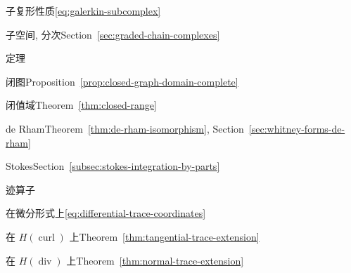 \begin{theindex}
\item {}\label{index:subcomplex-property}{子复形性质}\quad \eqref{eq:galerkin-subcomplex}

\item {}\label{index:subspace-graded}{子空间, 分次}\quad Section~\ref{sec:graded-chain-complexes}

\item {}\label{index:theorem}{定理}

\subitem {}\label{index:theorem-closed-graph}{闭图}\quad Proposition~\ref{prop:closed-graph-domain-complete}

\subitem {}\label{index:theorem-closed-range}{闭值域}\quad Theorem~\ref{thm:closed-range}

\subitem {}\label{index:theorem-de-rham}{de Rham}\quad Theorem~\ref{thm:de-rham-isomorphism}, Section~\ref{sec:whitney-forms-de-rham}

\subitem {}\label{index:theorem-stokes}{Stokes}\quad Section~\ref{subsec:stokes-integration-by-parts}

\item {}\label{index:trace-operator}{迹算子}

\subitem {}\label{index:trace-operator-on-differential-forms}{在微分形式上}\quad \eqref{eq:differential-trace-coordinates}

\subitem {}\label{index:trace-operator-on-h-operatorname-curl}{在 $H(\operatorname{curl})$ 上}\quad Theorem~\ref{thm:tangential-trace-extension}

\subitem {}\label{index:trace-operator-on-h-operatorname-div}{在 $H(\operatorname{div})$ 上}\quad Theorem~\ref{thm:normal-trace-extension}


\end{theindex}
